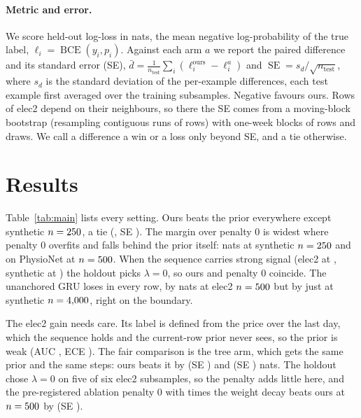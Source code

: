 \documentclass{article}
\begin{document}
\paragraph{Metric and error.} We score held-out log-loss in nats, the mean negative log-probability of the true
label, $\ell_i = \operatorname{BCE}(y_i, p_i)$. Against each arm $a$ we report the paired difference and its
standard error (SE), $\bar d = \frac{1}{n_{\text{test}}} \sum_{i} (\ell_i^{\text{ours}} - \ell_i^{a})$ and
$\operatorname{SE} = s_d / \sqrt{n_{\text{test}}}$, where $s_d$ is the standard deviation of the per-example differences, each test example first averaged over the
\nSplitCount{} training subsamples. Negative favours ours. Rows of elec2 depend on their neighbours, so there the SE
comes from a moving-block bootstrap (resampling contiguous runs of rows) \citep{kunsch1989bootstrap} with one-week
blocks of \nElecBlock{} rows and \nBootDraws{} draws. We call a difference a win or a loss only beyond \nKeepSE{} SE,
and a tie otherwise.

\section{Results}
\label{sec:results}

Table~\ref{tab:main} lists every setting. Ours beats the prior everywhere except synthetic $n = 250$, a tie
(\nSynCCLDPrior, SE \nSynCCLSEPrior). The margin over penalty 0 is widest where penalty 0 overfits and falls behind the prior
itself: \nSynCCLDabsLzero{} nats at synthetic $n = 250$ and \nPhysDDabsLzero{} on PhysioNet at $n = 500$. When the sequence carries strong
signal (elec2 at \nSizeMM, synthetic at \nSizeMMMM) the holdout picks $\lambda = 0$, so ours and penalty 0 coincide.
The unanchored GRU loses in every row, by \nElecDDabsUnanch{} nats at elec2 $n = 500$ but by just
\nSynMMMMDabsUnanch{} at synthetic $n = 4{,}000$, right on the boundary.

The elec2 gain needs care. Its label is defined from the price over the last day, which the sequence holds and the
current-row prior never sees, so the prior is weak (AUC \nElecDPriorAUC, ECE \nElecDPriorECE). The fair comparison is the tree arm, which gets the same prior and the same steps: ours
beats it by \nElecDDabsGbm{} (SE \nElecDSEGbm) and \nElecMMDabsGbm{} (SE \nElecMMSEGbm) nats. The holdout chose
$\lambda = 0$ on five of six elec2 subsamples, so the penalty adds little here, and the pre-registered ablation
penalty 0 with \nWdMult{} times the weight decay beats ours at $n = 500$ by \nElecDDabsWdTen{} (SE \nElecDSEWdTen).
\end{document}
